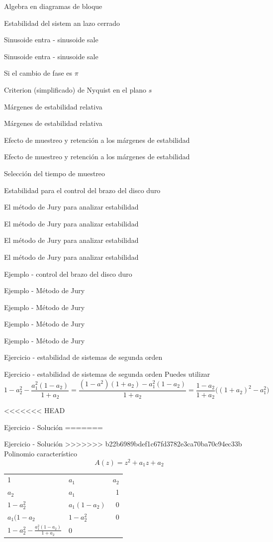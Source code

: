 \documentclass[presentation,aspectratio=169]{beamer}
\begin{document}
\begin{frame}[label={sec:org8e8e439}]{Algebra en diagramas de bloque}
\begin{frame}[label={sec:org5218f19}]{Estabilidad del sistem an lazo cerrado}
\begin{frame}[label={sec:org4ce2307}]{Sinusoide entra - sinusoide sale}
\begin{frame}[label={sec:orgc598966}]{Sinusoide entra - sinusoide sale}
\begin{frame}[label={sec:orgbd54147}]{Si el cambio de fase es \(\pi\)}
\begin{frame}[label={sec:orgf06388b}]{Criterion (simplificado) de Nyquist en el plano \(s\)}
\begin{frame}[label={sec:org5967884}]{Márgenes de estabilidad relativa}
\begin{frame}[label={sec:orgb5ba0e3}]{Márgenes de estabilidad relativa}
\begin{frame}[label={sec:orga8344a9}]{Efecto de muestreo y retención a los márgenes de estabilidad}
\begin{frame}[label={sec:org5e3653d}]{Efecto de muestreo y retención a los márgenes de estabilidad}
\begin{frame}[label={sec:orgd9a9d5d}]{Selección del tiempo de muestreo}
\begin{frame}[label={sec:org2cdebfb}]{Estabilidad para el control del brazo del disco duro}
\begin{frame}[label={sec:org6242817}]{El método de Jury para analizar estabilidad}
\begin{frame}[label={sec:org7c040d1}]{El método de Jury para analizar estabilidad}
\begin{frame}[label={sec:org85b11cd}]{El método de Jury para analizar estabilidad}
\begin{frame}[label={sec:org8bd183d}]{El método de Jury para analizar estabilidad}
\begin{frame}[label={sec:org4ec96eb}]{Ejemplo - control del brazo del disco duro}
\begin{frame}[label={sec:orgd803867}]{Ejemplo - Método de Jury}
\begin{frame}[label={sec:org8c0436d}]{Ejemplo - Método de Jury}
\begin{frame}[label={sec:org7f8ec49}]{Ejemplo - Método de Jury}
\begin{frame}[label={sec:org3031e62}]{Ejemplo - Método de Jury}
\begin{frame}[label={sec:org228180a}]{Ejercicio - estabilidad de sistemas de segunda orden}
\begin{frame}[label={sec:org421af03}]{Ejercicio - estabilidad de sistemas de segunda orden}
Puedes utilizar 
\[ 1-a_2^2 - \frac{a_1^2(1-a_2)}{1+a_2} = \frac{(1-a^2)(1+a_2) - a_1^2(1-a_2)}{1+a_2} = \frac{1-a_2}{1+a_2}\big((1+a_2)^2 - a_1^2\big)\]
\end{frame}

<<<<<<< HEAD
\begin{frame}[label={sec:orgef5d44f}]{Ejercicio - Solución}
=======
\begin{frame}[label={sec:org1be679a}]{Ejercicio - Solución}
>>>>>>> b22b6989bdef1c67fd3782e3ca70ba70c94ec33b
Polinomio característico \[A(z) = z^2 + a_1z + a_2\]

\begin{center}
\begin{tabular}{llr}
1 & \(a_1\) & \(a_2\)\\
\(a_2\) & \(a_1\) & 1\\
\(1 - a_2^2\) & \(a_1(1-a_2)\) & 0\\
\(a_1(1-a_2\) & \(1 - a_2^2\) & 0\\
\(1-a_2^2 - \frac{a_1^2(1-a_2)}{1+a_2}\) & 0 & \\
\end{tabular}
\end{center}


\end{frame}
\end{frame}
\end{frame}
\end{frame}
\end{frame}
\end{frame}
\end{frame}
\end{frame}
\end{frame}
\end{frame}
\end{frame}
\end{frame}
\end{frame}
\end{frame}
\end{frame}
\end{frame}
\end{frame}
\end{frame}
\end{frame}
\end{frame}
\end{frame}
\end{frame}
\end{frame}
\end{frame}
\end{document}
